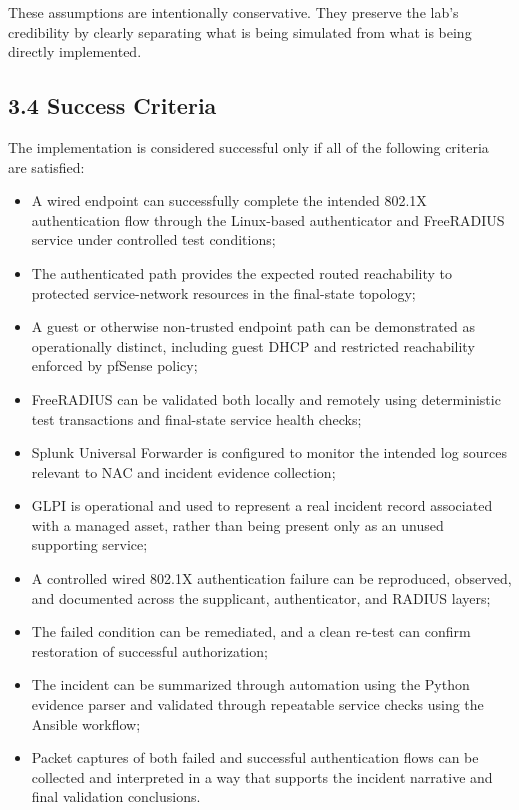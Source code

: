 \documentclass[11pt]{article}
\begin{document}
These assumptions are intentionally conservative. They preserve the lab's credibility by clearly separating what is being simulated from what is being directly implemented.


\subsection{3.4 Success Criteria}
\label{sec:success-criteria}

The implementation is considered successful only if all of the following criteria are satisfied:

\begin{itemize}
    \item A wired endpoint can successfully complete the intended 802.1X authentication flow through the Linux-based authenticator and FreeRADIUS service under controlled test conditions;
    \item The authenticated path provides the expected routed reachability to protected service-network resources in the final-state topology;
    \item A guest or otherwise non-trusted endpoint path can be demonstrated as operationally distinct, including guest DHCP and restricted reachability enforced by pfSense policy;
    \item FreeRADIUS can be validated both locally and remotely using deterministic test transactions and final-state service health checks;
    \item Splunk Universal Forwarder is configured to monitor the intended log sources relevant to NAC and incident evidence collection;
    \item GLPI is operational and used to represent a real incident record associated with a managed asset, rather than being present only as an unused supporting service;
    \item A controlled wired 802.1X authentication failure can be reproduced, observed, and documented across the supplicant, authenticator, and RADIUS layers;
    \item The failed condition can be remediated, and a clean re-test can confirm restoration of successful authorization;
    \item The incident can be summarized through automation using the Python evidence parser and validated through repeatable service checks using the Ansible workflow;
    \item Packet captures of both failed and successful authentication flows can be collected and interpreted in a way that supports the incident narrative and final validation conclusions.
\end{itemize}
\end{document}
